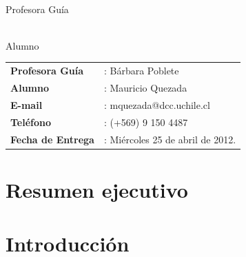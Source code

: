 \documentclass[11pt]{article}
\begin{document}
\begin{titlepage}
\begin{center}
\end{center}
\vspace*{1.6 in}
\begin{minipage}{0.5\textwidth}
\begin{center}\Large
 \makebox[2.5in]{\hrulefill}\\
 Profesora Guía
\end{center}
\end{minipage}
\begin{minipage}{0.5\textwidth}
\begin{center}\Large
 \makebox[2.5in]{\hrulefill}\\
 Alumno
\end{center}
\end{minipage}
\vspace*{1.6 in}
\begin{flushright}
\begin{tabular}{ll}
\textbf{Profesora Guía}	&: Bárbara Poblete \\
\textbf{Alumno} 	&: Mauricio Quezada\\
\textbf{E-mail} 	&: mquezada@dcc.uchile.cl\\
\textbf{Teléfono}	&: (+569) 9 150 4487 \\
\textbf{Fecha de Entrega} &: Miércoles 25 de abril de 2012. \\
\end{tabular}
\end{flushright}
\end{titlepage}

\pagestyle{encabezado}




\section*{Resumen ejecutivo}

\newpage


\newpage
\tableofcontents
\newpage


\section{Introducción}
\label{sec-1}
\end{document}
